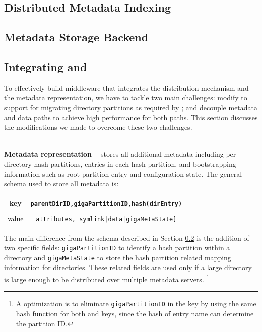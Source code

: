 \subsection{Distributed Metadata Indexing}
\label{design.giga}


\subsection{Metadata Storage Backend}
\label{design.tablefs}


\subsection{Integrating \giga{} and \tfs{}}
\label{design.integration}

To effectively build \sys middleware that integrates
the \giga distribution mechanism and the \tfs metadata representation,
we have to tackle two main challenges:
modify \tfs to support for
migrating directory partitions as required by \giga;
and decouple metadata and data paths to
achieve high performance for both paths.
This section discusses the modifications we made to
overcome these two challenges.


~\\
\textbf{Metadata representation -- }
\tfs stores all additional metadata including \giga per-directory hash
partitions, entries in each hash partition, and \giga
bootstrapping information such as root partition entry
and \giga configuration state.
The general schema used to store all metadata is:

\begin{table}[!htc]
\center
\vspace{10pt}
\begin{tabular}{c|c}
key & \texttt{parentDirID,gigaPartitionID,hash(dirEntry)} \\
\midrule \\
value & \texttt{attributes, symlink|data|gigaMetaState]} \\
\end{tabular}
\label{tab:keyschema}
\end{table}

The main difference from the \tfs schema described in Section
\ref{design.tablefs} is the addition of two \giga specific fields:
\texttt{gigaPartitionID} to identify a
\giga hash partition within a directory and \texttt{gigaMetaState} to store the
hash partition related mapping information for directories.
These \giga related fields are used only
if a large directory is large enough to be
distributed over multiple metadata servers.
\footnote{A optimization is to eliminate \texttt{gigaPartitionID} in the key
by using the same hash function for both \giga and \tfs keys,
since the hash of entry name can determine the partition ID.}


